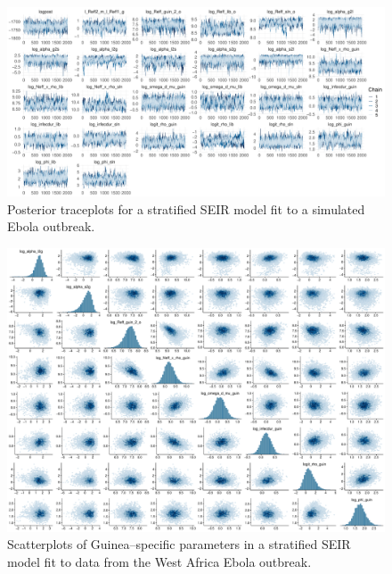 \begin{figure}
	\centering
	\includegraphics[width=\linewidth]{figures/ebola_joint_traces}
	\caption{Posterior traceplots for a stratified SEIR model fit to a simulated Ebola outbreak.}
	\label{fig:ebolajointtraces}
\end{figure}

\begin{figure}[htbp]
	\centering
	\includegraphics[width=\linewidth]{figures/ebola_joint_pairs_guin}
	\caption{Scatterplots of Guinea--specific parameters in a stratified SEIR model fit to data from the West Africa Ebola outbreak.}
	\label{fig:ebola_joint_pairs_guin}
\end{figure}


